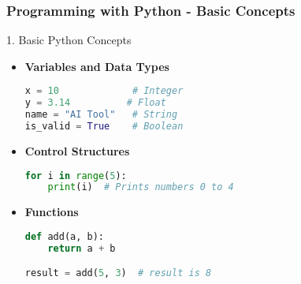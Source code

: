 \documentclass{beamer}
\begin{document}
\begin{frame}[fragile]
    \frametitle{Programming with Python - Basic Concepts}
    \begin{block}{1. Basic Python Concepts}
        \begin{itemize}
            \item \textbf{Variables and Data Types}
            \begin{lstlisting}[language=Python]
x = 10             # Integer
y = 3.14          # Float
name = "AI Tool"   # String
is_valid = True    # Boolean
            \end{lstlisting}

            \item \textbf{Control Structures}
            \begin{lstlisting}[language=Python]
for i in range(5):
    print(i)  # Prints numbers 0 to 4
            \end{lstlisting}

            \item \textbf{Functions}
            \begin{lstlisting}[language=Python]
def add(a, b):
    return a + b

result = add(5, 3)  # result is 8
            \end{lstlisting}
        \end{itemize}
    \end{block}
\end{frame}
\end{document}
